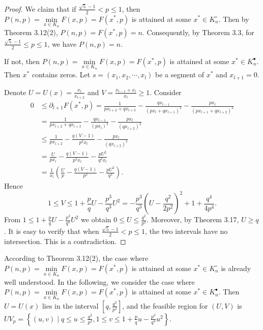 \documentclass[a4paper,fleqn,numbers]{cas-sc}
\begin{document}
	\begin{proof}
		We claim that if \( \frac{\sqrt{5}-1}{2}< p \leq 1 \), then \( P(n,p)=\min\limits_{x \in K_n} F(x,p)=F(x^*,p) \) is attained at some \( x^*\in K_n^{\circ} \). Then by Theorem 3.12(2), \( P(n,p)=F(x^*,p)=n \). Consequently, by Theorem 3.3, for \( \frac{\sqrt{5}-1}{2}\leq p \leq 1 \), we have \( P(n,p)=n \).
		
		If not, then \( P(n,p)=\min\limits_{x \in K_n} F(x,p)=F(x^*,p) \) is attained at some \( x^*\in K_n^{\bullet} \). Then \( x^* \) contains zeros. Let \( s=(x_1,x_2,\cdots,x_l) \) be a segment of \( x^* \) and \( x_{l+1}=0 \).
		
		Denote \( U=U(x)=\frac{x_l}{x_{l+2}} \) and \( V=\frac{x_{l-1}+x_l}{x_l}\geq 1 \). Consider
		\begin{align*}
			0&\leq\partial_{l+1}F(x^*,p)=\frac{1}{px_{l+2}+qx_{l+3}}-\frac{qx_{l-1}}{(px_l + qx_{l+1})^2}-\frac{px_l}{(px_{l+1} + qx_{l+2})^2}\\
			&=\frac{1}{px_{l+2}+qx_{l+3}}-\frac{qx_{l-1}}{(px_l)^2}-\frac{px_l}{(qx_{l+2})^2}\\
			&\leq\frac{1}{px_{l+2}}-\frac{q(V-1)}{p^2 x_l}-\frac{px_l}{(qx_{l+2})^2}\\
			&=\frac{U}{px_{l}}-\frac{q(V-1)}{p^2 x_l}-\frac{pU^2}{q^2 x_l}\\
			&=\frac{1}{x_l}\left(\frac{U}{p}-\frac{q(V-1)}{p^2}-\frac{pU^2}{q^2}\right).
		\end{align*}
		Hence
		\[
		1\leq V\leq 1+\frac{p}{q}U-\frac{p^3}{q^3}U^2=-\frac{p^3}{q^3} \left(U-\frac{q^2}{2p^2}\right)^2 +1+\frac{q^4}{4p^4}.
		\]
		From \( 1\leq 1+\frac{p}{q}U-\frac{p^3}{q^3}U^2 \) we obtain \( 0\leq U\leq\frac{q^2}{p^2} \). Moreover, by Theorem 3.17, \( U\geq q \). It is easy to verify that when \( \frac{\sqrt{5}-1}{2}< p \leq 1 \), the two intervals have no intersection. This is a contradiction.
	\end{proof}
	
	According to Theorem 3.12(2), the case where \( P(n,p)=\min\limits_{x \in K_n} F(x,p)=F(x^*,p) \) is attained at some \( x^*\in K_n^{\circ} \) is already well understood. In the following, we consider the case where \( P(n,p)=\min\limits_{x \in K_n} F(x,p)=F(x^*,p) \) is attained at some \( x^*\in K_n^{\bullet} \). Then \( U=U(x) \) lies in the interval \( \left[q,\frac{q^2}{p^2}\right] \), and the feasible region for \( (U,V) \) is \( UV_p =\left\{(u,v)\mid q\leq u\leq\frac{q^2}{p^2},1\leq v\leq 1+\frac{p}{q}u-\frac{p^3}{q^3}u^2\right\} \).
	
\end{document}
